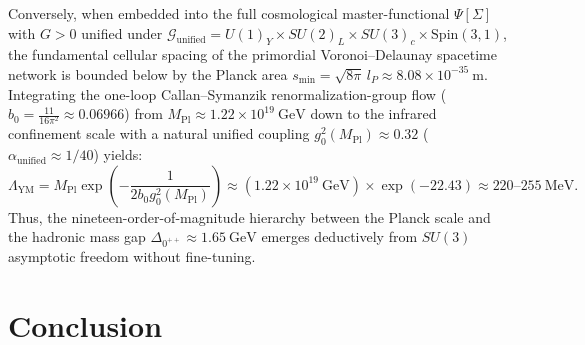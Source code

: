 \documentclass[11pt, a4paper]{article}
\theoremstyle{definition}
\theoremstyle{remark}
\begin{document}
Conversely, when embedded into the full cosmological master-functional $\Psi[\Sigma]$ with $G > 0$ unified under $\mathcal{G}_{\mathrm{unified}} = U(1)_{Y} \times SU(2)_{L} \times SU(3)_{c} \times \mathrm{Spin}(3,1)$, the fundamental cellular spacing of the primordial Voronoi--Delaunay spacetime network is bounded below by the Planck area $s_{\min} = \sqrt{8\pi}\,l_{P} \approx 8.08 \times 10^{-35}~\mathrm{m}$. Integrating the one-loop Callan--Symanzik renormalization-group flow ($b_{0} = \frac{11}{16\pi^{2}} \approx 0.06966$) from $M_{\mathrm{Pl}} \approx 1.22 \times 10^{19}~\mathrm{GeV}$ down to the infrared confinement scale with a natural unified coupling $g_{0}^{2}(M_{\mathrm{Pl}}) \approx 0.32$ ($\alpha_{\mathrm{unified}} \approx 1/40$) yields:
\begin{equation}
  \Lambda_{\mathrm{YM}} = M_{\mathrm{Pl}} \exp\!\left(-\frac{1}{2b_{0}g_{0}^{2}(M_{\mathrm{Pl}})}\right) \approx (1.22 \times 10^{19}~\mathrm{GeV}) \times \exp(-22.43) \approx 220\text{--}255~\mathrm{MeV}.
\end{equation}
Thus, the nineteen-order-of-magnitude hierarchy between the Planck scale and the hadronic mass gap $\Delta_{0^{++}} \approx 1.65~\mathrm{GeV}$ emerges deductively from $SU(3)$ asymptotic freedom without fine-tuning.

\section{Conclusion}
\end{document}
